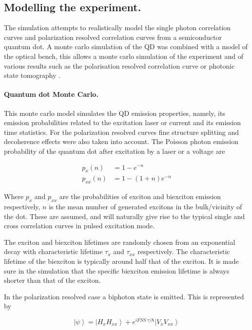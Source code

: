 \documentclass[12pt, twoside]{article}
\numberwithin{equation}{section}
\begin{document}
\subsection{Modelling the experiment.}\label{modelling-the-experiment.}

The simulation\cite{self2, github} attempts to realistically model the
single photon correlation curves and polarization resolved correlation
curves from a semiconductor quantum dot. A monte carlo simulation of the
QD was combined with a model of the optical bench, this allows a monte
carlo simulation of the experiment and of various results such as the
polarisation resolved correlation curve or photonic state tomography
\cite{amotomo}.

\paragraph{Quantum dot Monte Carlo.}\label{quantum-dot-monte-carlo.}

This monte carlo model simulates the QD emission properties, namely, its
emission probabilities related to the excitation laser or current and
its emission time statistics. For the polarization resolved curves fine
structure splitting and decoherence effects were also taken into
account. The Poisson photon emission probability of the quantum dot
after excitation by a laser or a voltage are \cite{grundmann}

\begin{align} 
p_x(n) &= 1 - e^{- n}\\
p_{xx}(n) &= 1 - (1+n)e^{- n}
\end{align}

Where $p_x$ and $p_{xx}$ are the probabilities of exciton and biexciton
emission respectively, $n$ is the mean number of generated excitons in
the bulk/vicinity of the dot. These are assumed, and will naturally give
rise to the typical single and cross correlation curves in pulsed
excitation mode.

The exciton and biexciton lifetimes are randomly chosen from an
exponential decay with characteristic lifetime $\tau_x$ and $\tau_{xx}$
respectively. The characteristic lifetime of the biexciton is typically
around half that of the exciton. It is made sure in the simulation that
the specific biexciton emission lifetime is always shorter than that of
the exciton.

In the polarization resolved case a biphoton state is emitted. This is
represented by

\begin{equation} 
\left|\psi\right\rangle = \left|H_xH_{xx}\right\rangle + e^{i FSS \  \tau/\hbar}\left|V_xV_{xx}\right\rangle
\end{equation}
\end{document}
